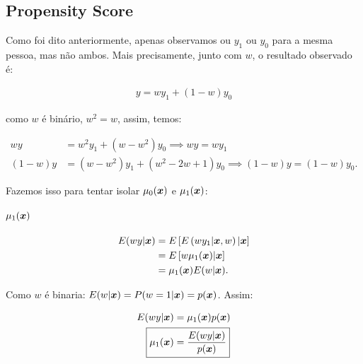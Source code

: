 \documentclass[11pt,oneside,a4paper]{article}
\numberwithin{equation}{section}
\begin{document}
\begin{description}
\begin{description}
\subsection*{Propensity Score}

Como foi dito anteriormente, apenas observamos ou $y_{1}$ ou $y_{0}$ para a mesma pessoa, mas não ambos.
Mais precisamente, junto com $w$, o resultado observado é:

\vspace{-1 em}
\begin{align*}
	y = wy_{1} + (1 - w) y_{0}
\end{align*}

\noindent
como  $w$ é binário, $w^2 = w$, assim, temos:

\vspace{-1 em}
\begin{align*}
w y &= w^{2} y_{1} + (w - w^{2}) y_{0}
\implies
\boxed{w y = w y_{1} }
\\
( 1 - w ) y &= (w - w^{2}) y_{1} + ( w^{2} - 2w + 1 ) y_{0}
\implies
\boxed{( 1 - w ) y = (1 - w) y_{0}}.
\end{align*}

Fazemos isso para tentar isolar $\mu_{0}(\boldsymbol{x})$ e $\mu_{1}(\boldsymbol{x})$:

\paragraph{$\mu_{1}( \boldsymbol{x} )$}

\begin{align*}
E( w y | \boldsymbol{x} ) &= E\left[  E \left( w y_{1} | \boldsymbol{x}, w  \right) | \boldsymbol{x} \right]
\\ &=
E \left[ w \mu_{1}(\boldsymbol{x}) | \boldsymbol{x} \right]
\\ &=
\mu_{1}(\boldsymbol{x}) E(w | \boldsymbol{x} ).
\end{align*}

\noindent
Como $w$ é binaria: $E(w| \boldsymbol{x}) = P(w=1 | \boldsymbol{x}) = p(\boldsymbol{x})$.
Assim:

\vspace{-1 em}
\begin{align*}
E( w y | \mbs{x} ) &= \mu_{1}(\mbs{x}) p(\mbs{x})
\\
\Aboxed{ \mu_{1}(\mbs{x}) &= \frac{E(w y | \mbs{x})}{p(\mbs{x})} }
\end{align*}


\end{description}
\end{description}
\end{document}
